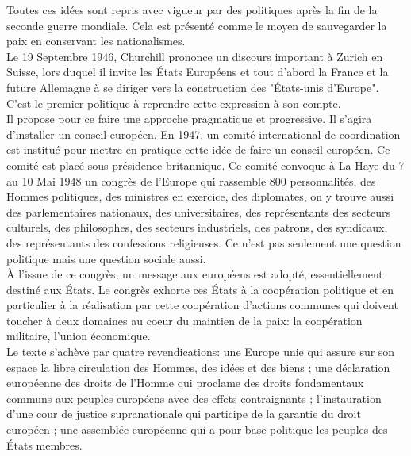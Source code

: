 \documentclass[10pt, a4paper, openany]{book}
\begin{document}
Toutes ces idées sont repris avec vigueur par des politiques après la fin de la seconde guerre mondiale. Cela est présenté comme le moyen de sauvegarder la paix en conservant les nationalismes. \\
Le 19 Septembre 1946, Churchill prononce un discours important à Zurich en Suisse, lors duquel il invite les États Européens et tout d'abord la France et la future Allemagne à se diriger vers la construction des "États-unis d'Europe". C'est le premier politique à reprendre cette expression à son compte. \\
Il propose pour ce faire une approche pragmatique et progressive. Il s'agira d'installer un conseil européen. En 1947, un comité international de coordination est institué pour mettre en pratique cette idée de faire un conseil européen. Ce comité est placé sous présidence britannique. Ce comité convoque à La Haye du 7 au 10 Mai 1948 un congrès de l'Europe qui rassemble 800 personnalités, des Hommes politiques, des ministres en exercice, des diplomates, on y trouve aussi des parlementaires nationaux, des universitaires, des représentants des secteurs culturels, des philosophes, des secteurs industriels, des patrons, des syndicaux, des représentants des confessions religieuses. Ce n'est pas seulement une question politique mais une question sociale aussi. \\
À l'issue de ce congrès, un message aux européens est adopté, essentiellement destiné aux États. Le congrès exhorte ces États à la coopération politique et en particulier à la réalisation par cette coopération d'actions communes qui doivent toucher à deux domaines au coeur du maintien de la paix: la coopération militaire, l'union économique. \\
Le texte s'achève par quatre revendications: une Europe unie qui assure sur son espace la libre circulation des Hommes, des idées et des biens ; une déclaration européenne des droits de l'Homme qui proclame des droits fondamentaux communs aux peuples européens avec des effets contraignants ; l'instauration d'une cour de justice supranationale qui participe de la garantie du droit européen ; une assemblée européenne qui a pour base politique les peuples des États membres.
\end{document}
